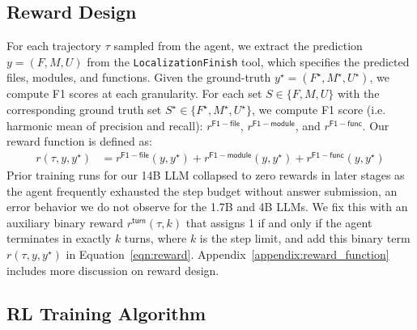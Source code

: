 \subsection{Reward Design}\label{sec:reward_design}
For each trajectory $\tau$ sampled from the agent, we extract the prediction $y = (F, M, U)$ from the \texttt{LocalizationFinish} tool, which specifies the predicted files, modules, and functions. Given the ground-truth $y^{\star} = (F^{\star}, M^{\star}, U^{\star})$, we compute F1 scores at each granularity. For each set $S \in \{F, M, U\}$ with the corresponding ground truth set $S^{\star} \in \{F^{\star}, M^{\star}, U^{\star}\}$, we compute F1 score (i.e. harmonic mean of precision and recall): $r^{\mathsf{F1-file}}$, $r^{\mathsf{F1-module}}$, and $r^{\mathsf{F1-func}}$. Our reward function is defined as:
\begin{equation}
\begin{aligned}
    r(\tau, y, y^{\star}) &= r^{\mathsf{F1-file}}(y, y^{\star}) + r^{\mathsf{F1-module}}(y, y^{\star}) + r^{\mathsf{F1-func}}(y, y^{\star})
\end{aligned}
\label{eqn:reward}
\end{equation}
Prior training runs for our 14B LLM collapsed to zero rewards in later stages as the agent frequently exhausted the step budget without answer submission, an error behavior we do not observe for the 1.7B and 4B LLMs. We fix this with an auxiliary binary reward $r^{\mathsf{turn}}(\tau, k)$ that assigns 1 if and only if the agent terminates in exactly $k$ turns, where $k$ is the step limit, and add this binary term $r(\tau, y, y^{\star})$ in Equation~\ref{eqn:reward}. Appendix~\ref{appendix:reward_function} includes more discussion on reward design.

\subsection{RL Training Algorithm}\label{sec:train_algo}

